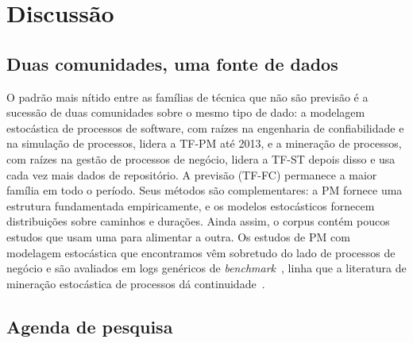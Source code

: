 \documentclass[preprint,12pt,authoryear=false]{elsarticle}
\newcommand{\PM}{TF-PM}
\newcommand{\ST}{TF-ST}
\newcommand{\FC}{TF-FC}
\begin{document}
\section{Discussão}\label{sec:discussion}

\subsection{Duas comunidades, uma fonte de dados}

O padrão mais nítido entre as famílias de técnica que não são previsão é a sucessão de duas comunidades sobre o mesmo tipo de dado: a modelagem estocástica de processos de software, com raízes na engenharia de confiabilidade e na simulação de processos, lidera a \PM{} até 2013, e a mineração de processos, com raízes na gestão de processos de negócio, lidera a \ST{} depois disso e usa cada vez mais dados de repositório. A previsão (\FC{}) permanece a maior família em todo o período. Seus métodos são complementares: a PM fornece uma estrutura fundamentada empiricamente, e os modelos estocásticos fornecem distribuições sobre caminhos e durações. Ainda assim, o corpus contém poucos estudos que usam uma para alimentar a outra. Os estudos de PM com modelagem estocástica que encontramos vêm sobretudo do lado de processos de negócio e são avaliados em logs genéricos de \emph{benchmark}~\cite{incerto2025,lopezpintado2023}, linha que a literatura de mineração estocástica de processos dá continuidade~\cite{burke2020}.

\subsection{Agenda de pesquisa}\label{sec:agenda}
\end{document}
